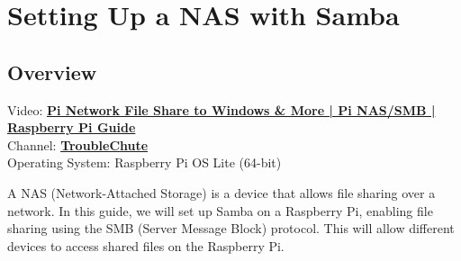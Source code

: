 \section{Setting Up a NAS with Samba}

\subsection{Overview}
Video: \href{https://www.youtube.com/watch?v=8QxJWW0mjAs}{\textbf{\color{blue}Pi Network File Share to Windows \& More | Pi NAS/SMB | Raspberry Pi Guide}} \\
Channel: \href{https://www.youtube.com/@TroubleChute}{\textbf{\color{blue}TroubleChute}} \\
Operating System: Raspberry Pi OS Lite (64-bit)

A NAS (Network-Attached Storage) is a device that allows file sharing over a network. In this guide, we will set up Samba on a Raspberry Pi, enabling file sharing using the SMB (Server Message Block) protocol. This will allow different devices to access shared files on the Raspberry Pi.

